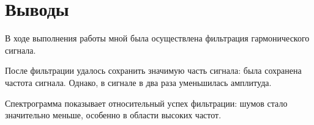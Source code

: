 \newpage
\section{Выводы}
В ходе выполнения работы мной была осуществлена фильтрация гармонического сигнала.

После фильтрации удалось сохранить значимую часть сигнала: была сохранена частота сигнала. Однако, в сигнале в два раза уменьшилась амплитуда.

Спектрограмма показывает относительный успех фильтрации: шумов стало значительно меньше, особенно в области высоких частот.

